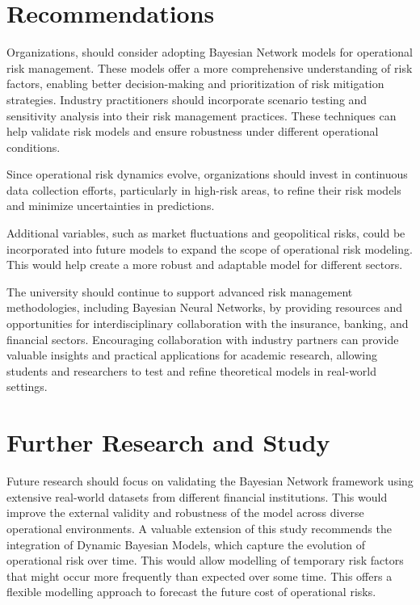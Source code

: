 \section{Recommendations}
Organizations, should consider adopting Bayesian Network models for operational risk management. These models offer a more comprehensive understanding of risk factors, enabling better decision-making and prioritization of risk mitigation strategies.
Industry practitioners should incorporate scenario testing and sensitivity analysis into their risk management practices. These techniques can help validate risk models and ensure robustness under different operational conditions.

Since operational risk dynamics evolve, organizations should invest in continuous data collection efforts, particularly in high-risk areas, to refine their risk models and minimize uncertainties in predictions.

Additional variables, such as market fluctuations and geopolitical risks, could be incorporated into future models to expand the scope of operational risk modeling. This would help create a more robust and adaptable model for different sectors.

The university should continue to support advanced risk management methodologies, including Bayesian Neural Networks, by providing resources and opportunities for interdisciplinary collaboration with the insurance, banking, and financial sectors. Encouraging collaboration with industry partners can provide valuable insights and practical applications for academic research, allowing students and researchers to test and refine theoretical models in real-world settings.
\section{Further Research and Study}

Future research should focus on validating the Bayesian Network framework using extensive real-world datasets from different financial institutions. This would improve the external validity and robustness of the model across diverse operational environments. A valuable extension of this study recommends the integration of Dynamic Bayesian Models, which capture the evolution of operational risk over time.  This would allow modelling of temporary risk factors that might occur more frequently than expected over some time. This offers a flexible modelling approach to forecast the future cost of operational risks. 

